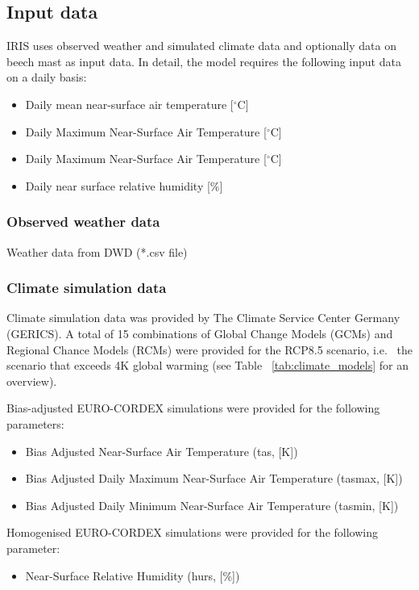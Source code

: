 \documentclass[a4paper, 11pt]{scrartcl}
\begin{document}
\subsection{Input data}
IRIS uses observed weather and simulated climate data and optionally data on beech mast as input data.
In detail, the model requires the following input data on a daily basis:
\begin{itemize}
\item Daily mean near-surface air temperature [${}^\circ$C]
\item Daily Maximum Near-Surface Air Temperature [${}^\circ$C]
\item Daily Maximum Near-Surface Air Temperature [${}^\circ$C]
\item Daily near surface relative humidity [\%]
\end{itemize}

\subsubsection{Observed weather data}
Weather data from DWD (*.csv file)

\subsubsection{Climate simulation data}
Climate simulation data was provided by The Climate Service Center Germany (GERICS). A total of 15 combinations of Global Change Models
(GCMs) and Regional Chance Models (RCMs) were provided for the RCP8.5 scenario, i.e. \ the scenario that exceeds 4K global warming
(see Table ~\ref{tab:climate_models} for an overview).

Bias-adjusted EURO-CORDEX simulations were provided for the following parameters:
\begin{itemize}
\item Bias Adjusted Near-Surface Air Temperature (tas, [K])
\item Bias Adjusted Daily Maximum Near-Surface Air Temperature (tasmax, [K])
\item Bias Adjusted Daily Minimum Near-Surface Air Temperature (tasmin, [K])
\end{itemize}

Homogenised EURO-CORDEX simulations were provided for the following parameter:
\begin{itemize}
\item Near-Surface Relative Humidity (hurs, [\%])
\end{itemize}
\end{document}
